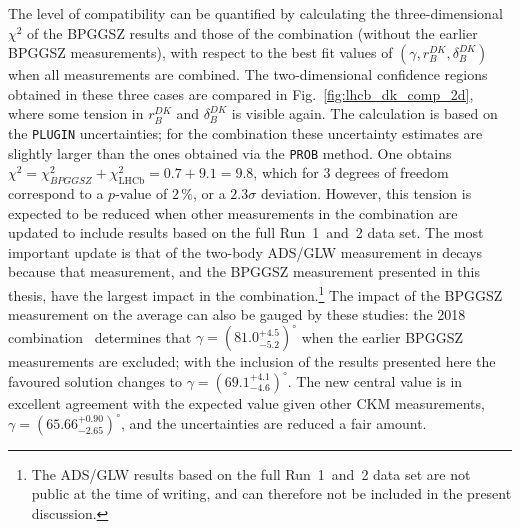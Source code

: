 The level of compatibility can be quantified by calculating the three-dimensional $\chi^2$ of the BPGGSZ results and those of the \lhcb combination (without the earlier BPGGSZ measurements), with respect to the best fit values of $(\gamma, r_B^{DK}, \delta_B^{DK})$ when all measurements are combined. The two-dimensional confidence regions obtained in these three cases are compared in Fig.~\ref{fig:lhcb_dk_comp_2d}, where some tension in $r_B^{DK}$ and $\delta_B^{DK}$ is visible again. The calculation is based on the \texttt{PLUGIN} uncertainties; for the \lhcb combination these uncertainty estimates are slightly larger than the ones obtained via the \texttt{PROB} method. One obtains $\chi^2=\chi^2_{BPGGSZ}+\chi^2_\text{LHCb} = 0.7 + 9.1 = 9.8$, which for 3 degrees of freedom correspond to a $p$-value of $2\,\%$, or a $2.3\sigma$ deviation. However, this tension is expected to be reduced when other measurements in the \lhcb combination are updated to include results based on the full Run~1~and~2 data set. The most important update is that of the two-body ADS/GLW measurement in \BtoDK decays because that measurement, and the BPGGSZ measurement presented in this thesis, have the largest impact in the combination.\footnote{The ADS/GLW results based on the full Run~1~and~2 data set are not public at the time of writing, and can therefore not be included in the present discussion.} The impact of the BPGGSZ measurement on the \lhcb average can also be gauged by these studies: the 2018 \lhcb combination~\cite{LHCb-CONF-2018-002} determines that $\gamma=(81.0^{+4.5}_{-5.2})^\circ$ when the earlier BPGGSZ measurements are excluded; with the inclusion of the results presented here the favoured solution changes to $\gamma=(69.1^{+4.1}_{-4.6})^\circ$. The new central value is in excellent agreement with the expected value given other CKM measurements, $\gamma=(65.66^{+0.90}_{-2.65})^\circ$, and the uncertainties are reduced a fair amount.


